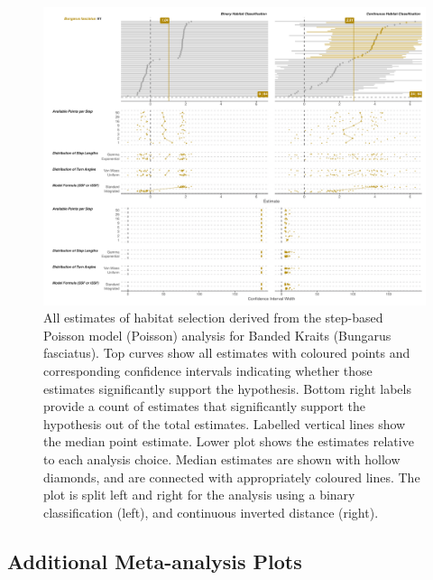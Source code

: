 \documentclass[10pt,a4paper]{article}
\begin{document}
\begin{figure}
\includegraphics[width=1\linewidth]{../../figures/specCurve_Bungarus fasciatus_pois} \caption{All estimates of habitat selection derived from the step-based Poisson model (Poisson) analysis for Banded Kraits (Bungarus fasciatus). Top curves show all estimates with coloured points and corresponding confidence intervals indicating whether those estimates significantly support the hypothesis. Bottom right labels provide a count of estimates that significantly support the hypothesis out of the total estimates. Labelled vertical lines show the median point estimate. Lower plot shows the estimates relative to each analysis choice. Median estimates are shown with hollow diamonds, and are connected with appropriately coloured lines. The plot is split left and right for the analysis using a binary classification (left), and continuous inverted distance (right).}\label{fig:specCurvePoisBUFA}
\end{figure}

\subsection{Additional Meta-analysis Plots}\label{additional-meta-analysis-plots}
\end{document}
